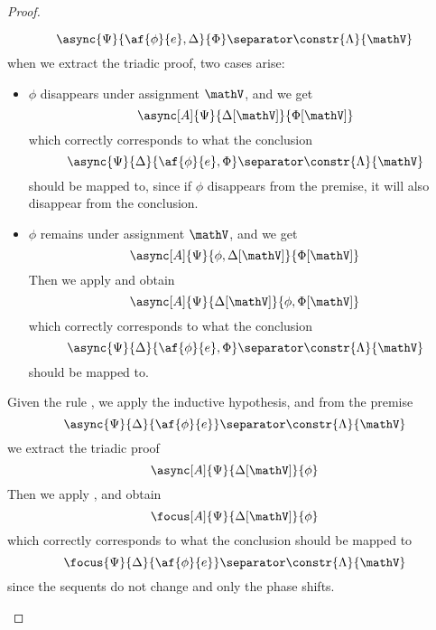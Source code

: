 \begin{proof}
\begin{itemize}
			$$ \async{\Psi}{\af{\phi}{e}, \Delta}{\Phi} \separator \constr{\Lambda}{\mathV} $$
			when we extract the triadic proof, two cases arise:
			\begin{itemize}
				\item $\phi$ disappears under assignment $\mathV$, and we get
					$$ \async[A]{\Psi}{\Delta[\mathV]}{\Phi[\mathV]} $$
					which correctly corresponds to what the conclusion
					$$ \async{\Psi}{\Delta}{\af{\phi}{e}, \Phi} \separator \constr{\Lambda}{\mathV} $$
					should be mapped to, since if $\phi$ disappears from the premise, it will also disappear from the conclusion.
				\item $\phi$ remains under assignment $\mathV$, and we get
					$$ \async[A]{\Psi}{\phi, \Delta[\mathV]}{\Phi[\mathV]} $$
					Then we apply \derRule[A]{\displaytodelta} and obtain
					$$ \async[A]{\Psi}{\Delta[\mathV]}{\phi, \Phi[\mathV]} $$
					which correctly corresponds to what the conclusion
					$$ \async{\Psi}{\Delta}{\af{\phi}{e}, \Phi} \separator \constr{\Lambda}{\mathV} $$
					should be mapped to.
			\end{itemize}
		\indCase{\displaytoasy} Given the rule \derRule{\displaytoasy}, we apply the inductive hypothesis, and from the premise
			$$ \async{\Psi}{\Delta}{\af{\phi}{e}} \separator \constr{\Lambda}{\mathV} $$
			we extract the triadic proof
			$$ \async[A]{\Psi}{\Delta[\mathV]}{\phi} $$
			Then we apply \derRule[A]{\displaytoasy}, and obtain
			$$ \focus[A]{\Psi}{\Delta[\mathV]}{\phi} $$
			which correctly corresponds to what the conclusion should be mapped to
			$$ \focus{\Psi}{\Delta}{\af{\phi}{e}} \separator \constr{\Lambda}{\mathV} $$
			since the sequents do not change and only the phase shifts.
	\end{itemize}
\end{proof}


